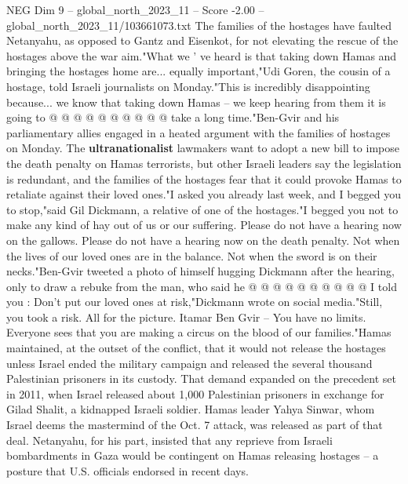 \begin{textsample}{NEG Dim 9 – global\_north\_2023\_11 – Score -2.00 – global\_north\_2023\_11/103661073.txt}
The families of the hostages have faulted Netanyahu, as opposed to Gantz and Eisenkot, for not elevating the rescue of the hostages above the war aim."What we ' ve heard is that taking down Hamas and bringing the hostages home are... equally important,"Udi Goren, the cousin of a hostage, told Israeli journalists on Monday."This is incredibly disappointing because... we know that taking down Hamas -- we keep hearing from them it is going to @ @ @ @ @ @ @ @ @ @ take a long time."Ben-Gvir and his parliamentary allies engaged in a heated argument with the families of hostages on Monday.
The \textbf{ultranationalist} lawmakers want to adopt a new bill to impose the death penalty on Hamas terrorists, but other Israeli leaders say the legislation is redundant, and the families of the hostages fear that it could provoke Hamas to retaliate against their loved ones."I asked you already last week, and I begged you to stop,"said Gil Dickmann, a relative of one of the hostages."I begged you not to make any kind of hay out of us or our suffering.
Please do not have a hearing now on the gallows.
Please do not have a hearing now on the death penalty.
Not when the lives of our loved ones are in the balance.
Not when the sword is on their necks."Ben-Gvir tweeted a photo of himself hugging Dickmann after the hearing, only to draw a rebuke from the man, who said he @ @ @ @ @ @ @ @ @ @ I told you : Don't put our loved ones at risk,"Dickmann wrote on social media."Still, you took a risk.
All for the picture.
Itamar Ben Gvir -- You have no limits.
Everyone sees that you are making a circus on the blood of our families."Hamas maintained, at the outset of the conflict, that it would not release the hostages unless Israel ended the military campaign and released the several thousand Palestinian prisoners in its custody.
That demand expanded on the precedent set in 2011, when Israel released about 1,000 Palestinian prisoners in exchange for Gilad Shalit, a kidnapped Israeli soldier.
Hamas leader Yahya Sinwar, whom Israel deems the mastermind of the Oct. 7 attack, was released as part of that deal.
Netanyahu, for his part, insisted that any reprieve from Israeli bombardments in Gaza would be contingent on Hamas releasing hostages -- a posture that U.S. officials endorsed in recent days.

\end{textsample}

